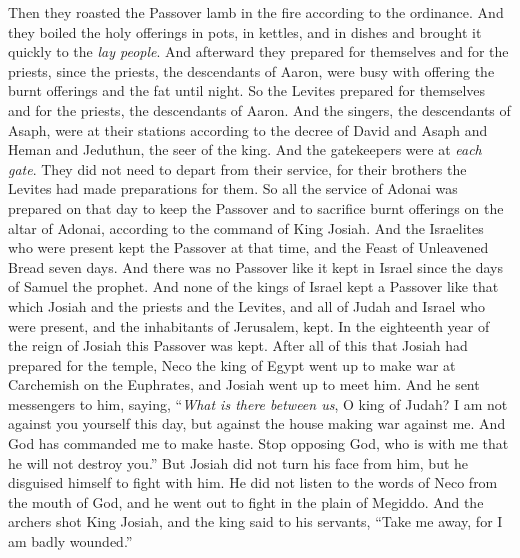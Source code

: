 \begin{biblechapter}
\verse Then they roasted the Passover lamb in the fire according to the ordinance. And they boiled the holy offerings in pots, in kettles, and in dishes and brought it quickly to the \textit{lay people}.
\verse And afterward they prepared for themselves and for the priests, since the priests, the descendants of Aaron, were busy with offering the burnt offerings and the fat until night. So the Levites prepared for themselves and for the priests, the descendants of Aaron.
\verse And the singers, the descendants of Asaph, were at their stations according to the decree of David and Asaph and Heman and Jeduthun, the seer of the king. And the gatekeepers were at \textit{each gate}. They did not need to depart from their service, for their brothers the Levites had made preparations for them.
\verse So all the service of Adonai was prepared on that day to keep the Passover and to sacrifice burnt offerings on the altar of Adonai, according to the command of King Josiah.
\verse And the Israelites who were present kept the Passover at that time, and the Feast of Unleavened Bread seven days.
\verse And there was no Passover like it kept in Israel since the days of Samuel the prophet. And none of the kings of Israel kept a Passover like that which Josiah and the priests and the Levites, and all of Judah and Israel who were present, and the inhabitants of Jerusalem, kept.
\verse In the eighteenth year of the reign of Josiah this Passover was kept.
 After all of this that Josiah had prepared for the temple, Neco the king of Egypt went up to make war at Carchemish on the Euphrates, and Josiah went up to meet him.
\verse And he sent messengers to him, saying, “\textit{What is there between us}, O king of Judah? I am not against you yourself this day, but against the house making war against me. And God has commanded me to make haste. Stop opposing God, who is with me that he will not destroy you.”
\verse But Josiah did not turn his face from him, but he disguised himself to fight with him. He did not listen to the words of Neco from the mouth of God, and he went out to fight in the plain of Megiddo.
\verse And the archers shot King Josiah, and the king said to his servants, “Take me away, for I am badly wounded.”

\end{biblechapter}
